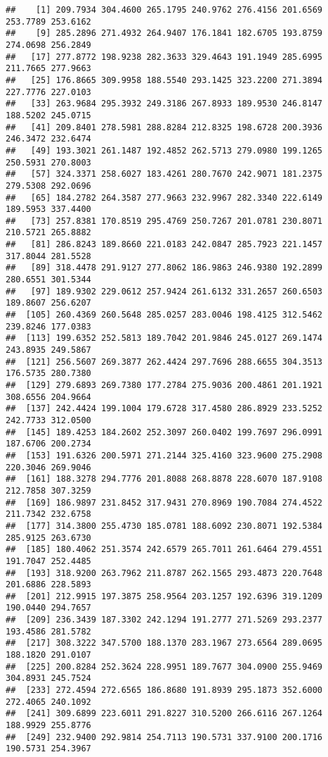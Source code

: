 \documentclass[
]{article}
\begin{document}
\begin{verbatim}
##    [1] 209.7934 304.4600 265.1795 240.9762 276.4156 201.6569 253.7789 253.6162
##    [9] 285.2896 271.4932 264.9407 176.1841 182.6705 193.8759 274.0698 256.2849
##   [17] 277.8772 198.9238 282.3633 329.4643 191.1949 285.6995 211.7665 277.9663
##   [25] 176.8665 309.9958 188.5540 293.1425 323.2200 271.3894 227.7776 227.0103
##   [33] 263.9684 295.3932 249.3186 267.8933 189.9530 246.8147 188.5202 245.0715
##   [41] 209.8401 278.5981 288.8284 212.8325 198.6728 200.3936 246.3472 232.6474
##   [49] 193.3021 261.1487 192.4852 262.5713 279.0980 199.1265 250.5931 270.8003
##   [57] 324.3371 258.6027 183.4261 280.7670 242.9071 181.2375 279.5308 292.0696
##   [65] 184.2782 264.3587 277.9663 232.9967 282.3340 222.6149 189.5953 337.4400
##   [73] 257.8381 170.8519 295.4769 250.7267 201.0781 230.8071 210.5721 265.8882
##   [81] 286.8243 189.8660 221.0183 242.0847 285.7923 221.1457 317.8044 281.5528
##   [89] 318.4478 291.9127 277.8062 186.9863 246.9380 192.2899 280.6551 301.5344
##   [97] 189.9302 229.0612 257.9424 261.6132 331.2657 260.6503 189.8607 256.6207
##  [105] 260.4369 260.5648 285.0257 283.0046 198.4125 312.5462 239.8246 177.0383
##  [113] 199.6352 252.5813 189.7042 201.9846 245.0127 269.1474 243.8935 249.5867
##  [121] 256.5607 269.3877 262.4424 297.7696 288.6655 304.3513 176.5735 280.7380
##  [129] 279.6893 269.7380 177.2784 275.9036 200.4861 201.1921 308.6556 204.9664
##  [137] 242.4424 199.1004 179.6728 317.4580 286.8929 233.5252 242.7733 312.0500
##  [145] 189.4253 184.2602 252.3097 260.0402 199.7697 296.0991 187.6706 200.2734
##  [153] 191.6326 200.5971 271.2144 325.4160 323.9600 275.2908 220.3046 269.9046
##  [161] 188.3278 294.7776 201.8088 268.8878 228.6070 187.9108 212.7858 307.3259
##  [169] 186.9897 231.8452 317.9431 270.8969 190.7084 274.4522 211.7342 232.6758
##  [177] 314.3800 255.4730 185.0781 188.6092 230.8071 192.5384 285.9125 263.6730
##  [185] 180.4062 251.3574 242.6579 265.7011 261.6464 279.4551 191.7047 252.4485
##  [193] 318.9200 263.7962 211.8787 262.1565 293.4873 220.7648 201.6886 228.5893
##  [201] 212.9915 197.3875 258.9564 203.1257 192.6396 319.1209 190.0440 294.7657
##  [209] 236.3439 187.3302 242.1294 191.2777 271.5269 293.2377 193.4586 281.5782
##  [217] 308.3222 347.5700 188.1370 283.1967 273.6564 289.0695 188.1820 291.0107
##  [225] 200.8284 252.3624 228.9951 189.7677 304.0900 255.9469 304.8931 245.7524
##  [233] 272.4594 272.6565 186.8680 191.8939 295.1873 352.6000 272.4065 240.1092
##  [241] 309.6899 223.6011 291.8227 310.5200 266.6116 267.1264 188.9929 255.8776
##  [249] 232.9400 292.9814 254.7113 190.5731 337.9100 200.1716 190.5731 254.3967

\end{verbatim}
\end{document}

